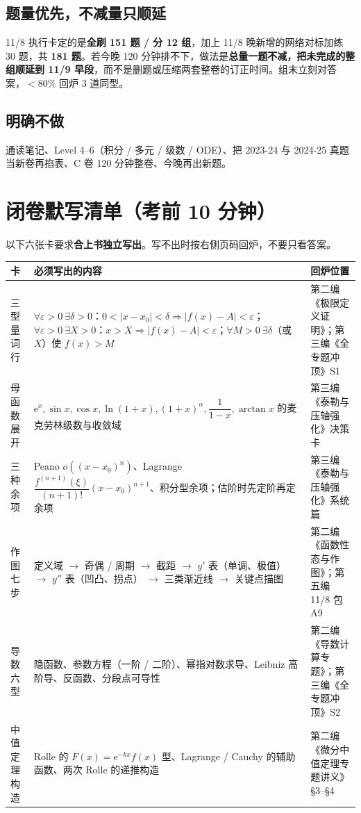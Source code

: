 \documentclass[11pt,a4paper]{ctexart}
\newcommand{\ee}{\mathrm{e}}
\newcommand{\eps}{\varepsilon}
\newcommand{\key}[1]{\textbf{#1}}
\begin{document}
\subsection{题量优先，不减量只顺延}
11/8 执行卡定的是\textbf{全刷 151 题 / 分 12 组}，加上 11/8 晚新增的网络对标加练 30 题，共 \textbf{181 题}。若今晚 120 分钟排不下，做法是\key{总量一题不减，把未完成的整组顺延到 11/9 早段}，而不是删题或压缩两套整卷的订正时间。组末立刻对答案，$<80\%$ 回炉 3 道同型。

\subsection{明确不做}
通读笔记、Level 4--6（积分 / 多元 / 级数 / ODE）、把 2023-24 与 2024-25 真题当新卷再掐表、C 卷 120 分钟整卷、今晚再出新题。

\newpage
\section{闭卷默写清单（考前 10 分钟）}

\noindent 以下六张卡要求\textbf{合上书独立写出}。写不出时按右侧页码回炉，不要只看答案。

\begin{longtable}{@{}p{3.2cm}p{8.0cm}p{3.8cm}@{}}
\toprule
\textbf{卡} & \textbf{必须写出的内容} & \textbf{回炉位置} \\
\midrule
三型量词行 & $\forall\eps>0\ \exists\delta>0$：$0<|x-x_0|<\delta\Rightarrow|f(x)-A|<\eps$；$\forall\eps>0\ \exists X>0$：$x>X\Rightarrow|f(x)-A|<\eps$；$\forall M>0\ \exists\delta$（或 $X$）使 $f(x)>M$ & 第二编《极限定义证明》；第三编《全专题冲顶》S1 \\
母函数展开 & $\ee^x,\sin x,\cos x,\ln(1+x),(1+x)^\alpha,\dfrac1{1-x},\arctan x$ 的麦克劳林级数与收敛域 & 第三编《泰勒与压轴强化》决策卡 \\
三种余项 & Peano $o((x-x_0)^n)$、Lagrange $\dfrac{f^{(n+1)}(\xi)}{(n+1)!}(x-x_0)^{n+1}$、积分型余项；估阶时先定阶再定余项 & 第三编《泰勒与压轴强化》系统篇 \\
作图七步 & 定义域 $\to$ 奇偶 / 周期 $\to$ 截距 $\to$ $y'$ 表（单调、极值） $\to$ $y''$ 表（凹凸、拐点） $\to$ 三类渐近线 $\to$ 关键点描图 & 第二编《函数性态与作图》；第五编 11/8 包 A9 \\
导数六型 & 隐函数、参数方程（一阶 / 二阶）、幂指对数求导、Leibniz 高阶导、反函数、分段点可导性 & 第二编《导数计算专题》；第三编《全专题冲顶》S2 \\
中值定理构造 & Rolle 的 $F(x)=\ee^{-kx}f(x)$ 型、Lagrange / Cauchy 的辅助函数、两次 Rolle 的递推构造 & 第二编《微分中值定理专题讲义》\S3--\S4 \\
\bottomrule
\end{longtable}
\end{document}
